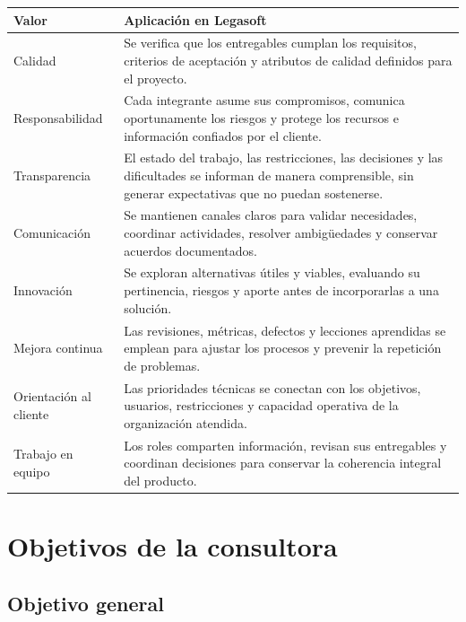 \begin{center}
\begin{tabularx}{\linewidth}{@{}L{3.6cm} Y@{}}
\toprule
\sffamily\bfseries\color{lgPrimario}Valor &
\sffamily\bfseries\color{lgPrimario}Aplicación en Legasoft \\
\midrule
Calidad & Se verifica que los entregables cumplan los requisitos, criterios de aceptación y atributos de calidad definidos para el proyecto. \\
Responsabilidad & Cada integrante asume sus compromisos, comunica oportunamente los riesgos y protege los recursos e información confiados por el cliente. \\
Transparencia & El estado del trabajo, las restricciones, las decisiones y las dificultades se informan de manera comprensible, sin generar expectativas que no puedan sostenerse. \\
Comunicación & Se mantienen canales claros para validar necesidades, coordinar actividades, resolver ambigüedades y conservar acuerdos documentados. \\
Innovación & Se exploran alternativas útiles y viables, evaluando su pertinencia, riesgos y aporte antes de incorporarlas a una solución. \\
Mejora continua & Las revisiones, métricas, defectos y lecciones aprendidas se emplean para ajustar los procesos y prevenir la repetición de problemas. \\
Orientación al cliente & Las prioridades técnicas se conectan con los objetivos, usuarios, restricciones y capacidad operativa de la organización atendida. \\
Trabajo en equipo & Los roles comparten información, revisan sus entregables y coordinan decisiones para conservar la coherencia integral del producto. \\
\bottomrule
\end{tabularx}
\end{center}

\section{Objetivos de la consultora}

\subsection{Objetivo general}

